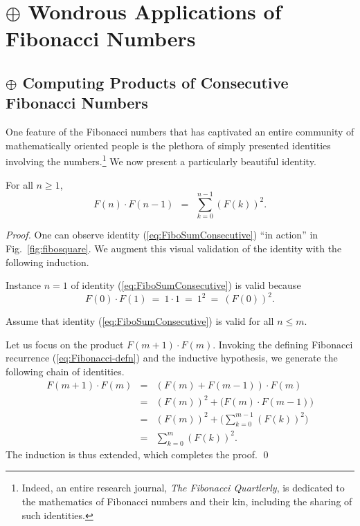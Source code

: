 
\chapter{$\oplus$ Wondrous Applications of Fibonacci Numbers}
\label{ch:FIBO-enrich}

\section{$\oplus$ Computing Products of Consecutive Fibonacci Numbers}
\label{sec:product-Fn-Fn+1}

One feature of the Fibonacci numbers that has captivated an entire
community of mathematically oriented people is the plethora of simply
presented identities involving the numbers.\footnote{Indeed, an entire
  research journal, {\it The Fibonacci Quartlerly}, is dedicated to the mathematics of Fibonacci
  numbers and their kin, including the sharing of such identities.}
We now present a particularly beautiful identity.

\begin{prop} 
\label{thm:FiboSumConsecutive}
For all $n \geq 1$,
\begin{equation}
\label{eq:FiboSumConsecutive}
F(n) \cdot F(n-1) \ \ = \ \ \sum_{k=0}^{n-1} (F(k))^2.
\end{equation}
\end{prop}

\begin{proof}
One can observe identity (\ref{eq:FiboSumConsecutive}) ``in action''
in Fig.~\ref{fig:fibosquare}.  We augment this visual validation of
the identity with the following induction.

\medskip

Instance $n=1$ of identity (\ref{eq:FiboSumConsecutive}) is valid
because
\[ F(0) \cdot F(1) \ = \ 1 \cdot 1 \ = \ 1^2 \ = \ (F(0))^2. \]

\medskip

Assume that identity (\ref{eq:FiboSumConsecutive}) is valid for all $n
\leq m$.

\medskip

  Let us focus on the product
$F(m+1) \cdot F(m)$.  Invoking the defining Fibonacci recurrence
(\ref{eq:Fibonacci-defn}) and the inductive hypothesis, we generate
the following chain of identities.
\begin{eqnarray*}
F(m+1) \cdot F(m)
 & = &
   (F(m) + F(m-1)) \cdot F(m) \\
 & = &
   (F(m))^2 + \big( F(m) \cdot F(m-1) \big) \\
 & = & 
   (F(m))^2 + \big( \sum_{k=0}^{m-1} (F(k))^2 \big) \\
 & = &
   \sum_{k=0}^{m} (F(k))^2.
\end{eqnarray*}
The induction is thus extended, which completes the proof.
\qed
\end{proof}


